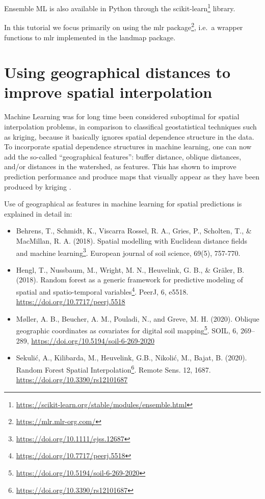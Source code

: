 \documentclass[
  graybox,natbib,nospthms]{svmono}
\providecommand{\tightlist}{%
  \setlength{\itemsep}{0pt}\setlength{\parskip}{0pt}}
\providecommand{\tightlist}{\setlength{\itemsep}{0pt}\setlength{\parskip}{0pt}}
\renewcommand{\href}[2]{#2 (\url{#1})}
\renewcommand{\href}[2]{#2\footnote{\url{#1}}}
\begin{document}
Ensemble ML is also available in Python through the \href{https://scikit-learn.org/stable/modules/ensemble.html}{scikit-learn} library.

In this tutorial we focus primarily on using the \href{https://mlr.mlr-org.com/}{mlr package},
i.e.~a wrapper functions to mlr implemented in the landmap package.

\hypertarget{using-geographical-distances-to-improve-spatial-interpolation}{%
\section*{Using geographical distances to improve spatial interpolation}\label{using-geographical-distances-to-improve-spatial-interpolation}}

Machine Learning was for long time been considered suboptimal for spatial
interpolation problems, in comparison to classifical geostatistical techniques
such as kriging, because it basically ignores spatial dependence structure in
the data. To incorporate spatial dependence structures in machine learning, one
can now add the so-called ``geographical features'': buffer distance, oblique
distances, and/or distances in the watershed, as features. This has shown to
improve prediction performance and produce maps that visually appear as they
have been produced by kriging \citep{hengl2018random}.

Use of geographical as features in machine learning for spatial predictions is explained in detail in:

\begin{itemize}
\tightlist
\item
  Behrens, T., Schmidt, K., Viscarra Rossel, R. A., Gries, P., Scholten, T., \& MacMillan, R. A. (2018). \href{https://doi.org/10.1111/ejss.12687}{Spatial modelling with Euclidean distance fields and machine learning}. European journal of soil science, 69(5), 757-770.
\item
  Hengl, T., Nussbaum, M., Wright, M. N., Heuvelink, G. B., \& Gräler, B. (2018). \href{https://doi.org/10.7717/peerj.5518}{Random forest as a generic framework for predictive modeling of spatial and spatio-temporal variables}. PeerJ, 6, e5518. \url{https://doi.org/10.7717/peerj.5518}\\
\item
  Møller, A. B., Beucher, A. M., Pouladi, N., and Greve, M. H. (2020). \href{https://doi.org/10.5194/soil-6-269-2020}{Oblique geographic coordinates as covariates for digital soil mapping}. SOIL, 6, 269--289, \url{https://doi.org/10.5194/soil-6-269-2020}
\item
  Sekulić, A., Kilibarda, M., Heuvelink, G.B., Nikolić, M., Bajat, B. (2020). \href{https://doi.org/10.3390/rs12101687}{Random Forest Spatial Interpolation}. Remote Sens. 12, 1687. \url{https://doi.org/10.3390/rs12101687}
\end{itemize}
\end{document}
